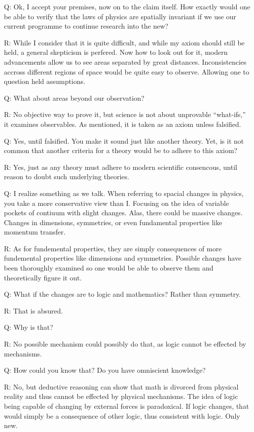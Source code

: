 Q: Ok, I accept your premises, now on to the claim itself. How exactly would one be able to verify that the laws of physics are spatially invariant if we use our current programme to continue research into the new?

R: While I consider that it is quite difficult, and while my axiom should still be held, a general skepticism is perfered. Now how to look out for it, modern advancements allow us to see areas separated by great distances. Inconsistencies accross different regions of space would be quite easy to observe. Allowing one to question held assumptions.

Q: What about areas beyond our observation?

R: No objective way to prove it, but science is not about unprovable ``what-ifs,'' it examines observables. As mentioned, it is taken as an axiom unless falsified.

Q: Yes, until falsified. You make it sound just like another theory. Yet, is it not common that another criteria for a theory would be to adhere to this axiom?

R: Yes, just as any theory must adhere to modern scientific consencous, until reason to doubt such underlying theories.

Q: I realize something as we talk. When referring to spacial changes in physics, you take a more conservative view than I. Focusing on the idea of variable pockets of contiuum with slight changes. Alas, there could be massive changes. Changes in dimensions, symmetries, or even fundamental properties like momentum transfer.

R: As for fundemental properties, they are simply consequences of more fundemental properties like dimensions and symmetries. Possible changes have been thoroughly examined so one would be able to observe them and theoretically figure it out.

Q: What if the changes are to logic and mathematics? Rather than symmetry.

R: That is absured.

Q: Why is that?

R: No possible mechanism could possibly do that, as logic cannot be effected by mechanisms.

Q: How could you know that? Do you have omniscient knowledge?

R: No, but deductive reasoning can show that math is divorced from physical reality and thus cannot be effected by physical mechanisms. The idea of logic being capable of changing by external forces is paradoxical. If logic changes, that would simply be a consequence of other logic, thus consistent with logic. Only new.

